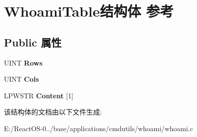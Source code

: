 \hypertarget{struct_whoami_table}{}\section{Whoami\+Table结构体 参考}
\label{struct_whoami_table}
\subsection*{Public 属性}
\begin{DoxyCompactItemize}
\item 
\mbox{\label{struct_whoami_table_a79ca42db3e7d4153b2bc387a298378cd}} 
U\+I\+NT {\bfseries Rows}
\item 
\mbox{\label{struct_whoami_table_ad986dc1c2b5ac181a26852fb2624cedb}} 
U\+I\+NT {\bfseries Cols}
\item 
\mbox{\label{struct_whoami_table_a9e69b9881f779ce90f4ff5751ebc1351}} 
L\+P\+W\+S\+TR {\bfseries Content} \mbox{[}1\mbox{]}
\end{DoxyCompactItemize}


该结构体的文档由以下文件生成\+:\begin{DoxyCompactItemize}
\item 
E\+:/\+React\+O\+S-\/0../base/applications/cmdutils/whoami/whoami.\+c\end{DoxyCompactItemize}
